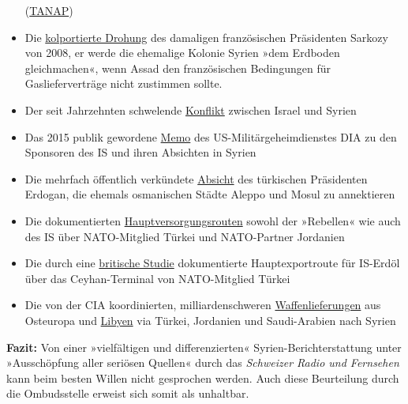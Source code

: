 \begin{itemize}
  (\href{https://de.wikipedia.org/wiki/Transanatolische_Pipeline}{TANAP})
\item
  Die \href{https://www.youtube.com/watch?v=hIMWfJmti7E}{kolportierte
  Drohung} des damaligen französischen Präsidenten Sarkozy von 2008, er
  werde die ehemalige Kolonie Syrien »dem Erdboden gleichmachen«, wenn
  Assad den französischen Bedingungen für Gaslieferverträge nicht
  zustimmen sollte.
\item
  Der seit Jahrzehnten schwelende
  \href{https://en.wikipedia.org/wiki/Israeli_involvement_in_the_Syrian_Civil_War}{Konflikt}
  zwischen Israel und Syrien
\item
  Das 2015 publik gewordene
  \href{http://www.globalresearch.ca/defense-intelligence-agency-create-a-salafist-principality-in-syria-facilitate-rise-of-islamic-state-in-order-to-isolate-the-syrian-regime/5451216}{Memo}
  des US-Militärgeheimdienstes DIA zu den Sponsoren des IS und ihren
  Absichten in Syrien
\item
  Die mehrfach öffentlich verkündete
  \href{https://www.heise.de/tp/features/Erdogan-Aleppo-gehoert-dem-tuerkischen-Volk-3360601.html}{Absicht}
  des türkischen Präsidenten Erdogan, die ehemals osmanischen Städte
  Aleppo und Mosul zu annektieren
\item
  Die dokumentierten
  \href{http://www.globalresearch.ca/logistics-101-where-does-isis-get-its-guns/5454726}{Hauptversorgungsrouten}
  sowohl der »Rebellen« wie auch des IS über NATO-Mitglied Türkei und
  NATO-Partner Jordanien
\item
  Die durch eine
  \href{https://web.archive.org/web/20170218175638/http://www.marsecreview.com/wp-content/uploads/2015/03/PAPER-on-CRUDE-OIL-and-ISIS.pdf}{britische
  Studie} dokumentierte Hauptexportroute für IS-Erdöl über das
  Ceyhan-Terminal von NATO-Mitglied Türkei
\item
  Die von der CIA koordinierten, milliardenschweren
  \href{http://www.balkaninsight.com/en/article/making-a-killing-the-1-2-billion-euros-arms-pipeline-to-middle-east-07-26-2016}{Waffenlieferungen}
  aus Osteuropa und
  \href{http://www.globalresearch.ca/cia-ops-finally-revealed-what-the-us-ambassador-in-benghazi-was-really-doing/5483957}{Libyen}
  via Türkei, Jordanien und Saudi-Arabien nach Syrien
\end{itemize}

\textbf{Fazit:} Von einer »vielfältigen und differenzierten«
Syrien-Berichterstattung unter »Ausschöpfung aller seriösen Quellen«
durch das \emph{Schweizer Radio und Fernsehen} kann beim besten Willen
nicht gesprochen werden. Auch diese Beurteilung durch die Ombudsstelle
erweist sich somit als unhaltbar.

